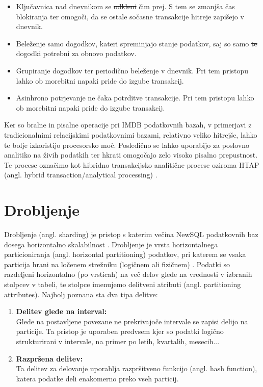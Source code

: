 \documentclass[a4paper, 12pt]{book}
\providecommand{\DIFaddtex}[1]{{\protect\color{blue}\uwave{#1}}} %
\providecommand{\DIFdeltex}[1]{{\protect\color{red}\sout{#1}}}                      %
\providecommand{\DIFaddbegin}{} %
\providecommand{\DIFaddend}{} %
\providecommand{\DIFdelbegin}{} %
\providecommand{\DIFdelend}{} %
\providecommand{\DIFadd}[1]{\texorpdfstring{\DIFaddtex{#1}}{#1}} %
\providecommand{\DIFdel}[1]{\texorpdfstring{\DIFdeltex{#1}}{}} %
\newcommand{\DIFscaledelfig}{0.5}
\newlength{\DIFdelgraphicswidth} %
\newlength{\DIFdelgraphicsheight} %
\newcommand{\DIFaddincludegraphics}[2][]{{\color{blue}\fbox{\DIFOincludegraphics[#1]{#2}}}} %
\newcommand{\DIFdelincludegraphics}[2][]{%
\sbox{\DIFdelgraphicsbox}{\DIFOincludegraphics[#1]{#2}}%
\settoboxwidth{\DIFdelgraphicswidth}{\DIFdelgraphicsbox} %
\settoboxtotalheight{\DIFdelgraphicsheight}{\DIFdelgraphicsbox} %
\scalebox{\DIFscaledelfig}{%
\parbox[b]{\DIFdelgraphicswidth}{\usebox{\DIFdelgraphicsbox}\\[-\baselineskip] \rule{\DIFdelgraphicswidth}{0em}}\llap{\resizebox{\DIFdelgraphicswidth}{\DIFdelgraphicsheight}{%
\setlength{\unitlength}{\DIFdelgraphicswidth}%
\begin{picture}(1,1)%
\thicklines\linethickness{2pt} %
{\color[rgb]{1,0,0}\put(0,0){\framebox(1,1){}}}%
{\color[rgb]{1,0,0}\put(0,0){\line( 1,1){1}}}%
{\color[rgb]{1,0,0}\put(0,1){\line(1,-1){1}}}%
\end{picture}%
}\hspace*{3pt}}} %
} %
\DeclareRobustCommand{\DIFaddbegin}{\DIFOaddbegin \let\includegraphics\DIFaddincludegraphics} %
\DeclareRobustCommand{\DIFaddend}{\DIFOaddend \let\includegraphics\DIFOincludegraphics} %
\DeclareRobustCommand{\DIFdelbegin}{\DIFOdelbegin \let\includegraphics\DIFdelincludegraphics} %
\DeclareRobustCommand{\DIFdelend}{\DIFOaddend \let\includegraphics\DIFOincludegraphics} %
\begin{document}
\begin{itemize}
    \item Ključavnica nad dnevnikom se \DIFdelbegin \DIFdel{odkleni }\DIFdelend \DIFaddbegin \DIFadd{odklene }\DIFaddend čim prej. S tem se zmanjša čas blokiranja ter omogoči, da se ostale sočasne transakcije hitreje zapišejo v dnevnik. \cite{NewSqlInMemoryAnalytics}
    \item Beleženje samo dogodkov, kateri spreminjajo stanje podatkov, saj so samo \DIFdelbegin \DIFdel{te }\DIFdelend \DIFaddbegin \DIFadd{ti }\DIFaddend dogodki potrebni za obnovo podatkov. \cite{MainMemoryDatabaseSystems}
    \item Grupiranje dogodkov ter periodično beleženje v dnevnik. Pri tem pristopu lahko ob morebitni napaki pride do izgube transakcij. \cite{NewSqlInMemoryAnalytics}
    \item Asinhrono potrjevanje ne čaka potrditve transakcije. Pri tem pristopu lahko ob morebitni napaki pride do izgube transakcij. \cite{NewSqlInMemoryAnalytics}
\end{itemize}

Ker so bralne in pisalne operacije pri IMDB podatkovnih bazah, v primerjavi z tradicionalnimi relacijskimi podatkovnimi bazami, relativno veliko hitrejše, lahko te bolje izkoristijo procesorsko moč. Posledično se lahko uporabijo za poslovno analitiko na živih podatkih ter hkrati omogočajo zelo visoko pisalno prepustnost. Te procese označimo kot hibridno transakcijsko analitične procese oziroma HTAP (angl. hybrid transaction/analytical processing) \cite{NewSqlInMemoryAnalytics}.


\section{Drobljenje}
Drobljenje (angl. sharding) je pristop s katerim večina NewSQL podatkovnih baz dosega horizontalno skalabilnost \cite{Pavlo2016Sep}. Drobljenje je vrsta horizontalnega particioniranja (angl. horizontal partitioning) podatkov, pri katerem se vsaka particija hrani na ločenem strežniku (logičnem ali fizičnem) \cite{WikiSharding}. Podatki so razdeljeni horizontalno (po vrsticah) na več delov glede na vrednosti v izbranih stolpcev v tabeli, te stolpce imenujemo delitveni atributi (angl. partitioning attributes). Najbolj poznana sta dva tipa delitve:

\begin{enumerate}
    \item \textbf{Delitev glede na interval:}\\Glede na postavljene povezane ne prekrivajoče intervale se zapisi delijo na particije. Ta pristop je uporaben predvsem kjer so podatki logično strukturirani v intervale, na primer po letih, kvartalih, mesecih...
    \item \textbf{Razpršena delitev:}\\Ta delitev za delovanje uporablja razpršitveno funkcijo (angl. hash function), katera podatke deli enakomerno preko vseh particij.
\end{enumerate}
\end{document}
